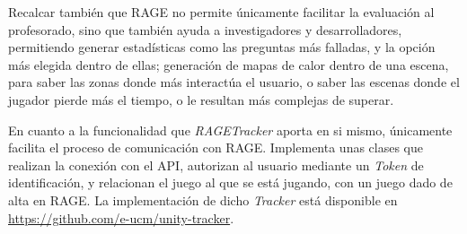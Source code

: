 Recalcar también que RAGE no permite únicamente facilitar la evaluación al profesorado, sino que también ayuda a investigadores y desarrolladores, permitiendo generar estadísticas como las preguntas más falladas, y la opción más elegida dentro de ellas; generación de mapas de calor dentro de una escena, para saber las zonas donde más interactúa el usuario, o saber las escenas donde el jugador pierde más el tiempo, o le resultan más complejas de superar.

En cuanto a la funcionalidad que \textit{RAGETracker} aporta en si mismo, únicamente facilita el proceso de comunicación con RAGE. Implementa unas clases que realizan la conexión con el API, autorizan al usuario mediante un \textit{Token} de identificación, y relacionan el juego al que se está jugando, con un juego dado de alta en RAGE. La implementación de dicho \textit{Tracker} está disponible en \url{https://github.com/e-ucm/unity-tracker}.